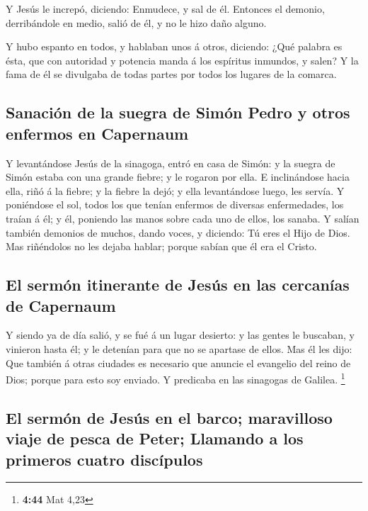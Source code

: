  Y Jesús le increpó, diciendo: Enmudece, y sal de él.
Entonces el demonio, derribándole en medio, salió de él, y no le hizo
daño alguno.

 Y hubo espanto en todos, y hablaban unos á otros,
diciendo: ¿Qué palabra es ésta, que con autoridad y potencia manda á los
espíritus inmundos, y salen?  Y la fama de él se
divulgaba de todas partes por todos los lugares de la comarca.

\hypertarget{sanaciuxf3n-de-la-suegra-de-simuxf3n-pedro-y-otros-enfermos-en-capernaum}{%
\subsection{Sanación de la suegra de Simón Pedro y otros enfermos en
Capernaum}\label{sanaciuxf3n-de-la-suegra-de-simuxf3n-pedro-y-otros-enfermos-en-capernaum}}

 Y levantándose Jesús de la sinagoga, entró en casa de
Simón: y la suegra de Simón estaba con una grande fiebre; y le rogaron
por ella.  E inclinándose hacia ella, riñó á la fiebre; y
la fiebre la dejó; y ella levantándose luego, les servía.
 Y poniéndose el sol, todos los que tenían enfermos de
diversas enfermedades, los traían á él; y él, poniendo las manos sobre
cada uno de ellos, los sanaba.  Y salían también demonios
de muchos, dando voces, y diciendo: Tú eres el Hijo de Dios. Mas
riñéndolos no les dejaba hablar; porque sabían que él era el Cristo.

\hypertarget{el-sermuxf3n-itinerante-de-jesuxfas-en-las-cercanuxedas-de-capernaum}{%
\subsection{El sermón itinerante de Jesús en las cercanías de
Capernaum}\label{el-sermuxf3n-itinerante-de-jesuxfas-en-las-cercanuxedas-de-capernaum}}

 Y siendo ya de día salió, y se fué á un lugar desierto:
y las gentes le buscaban, y vinieron hasta él; y le detenían para que no
se apartase de ellos.  Mas él les dijo: Que también á
otras ciudades es necesario que anuncie el evangelio del reino de Dios;
porque para esto soy enviado.  Y predicaba en las
sinagogas de Galilea. \footnote{\textbf{4:44} Mat 4,23}

\hypertarget{el-sermuxf3n-de-jesuxfas-en-el-barco-maravilloso-viaje-de-pesca-de-peter-llamando-a-los-primeros-cuatro-discuxedpulos}{%
\subsection{El sermón de Jesús en el barco; maravilloso viaje de pesca
de Peter; Llamando a los primeros cuatro
discípulos}\label{el-sermuxf3n-de-jesuxfas-en-el-barco-maravilloso-viaje-de-pesca-de-peter-llamando-a-los-primeros-cuatro-discuxedpulos}}

